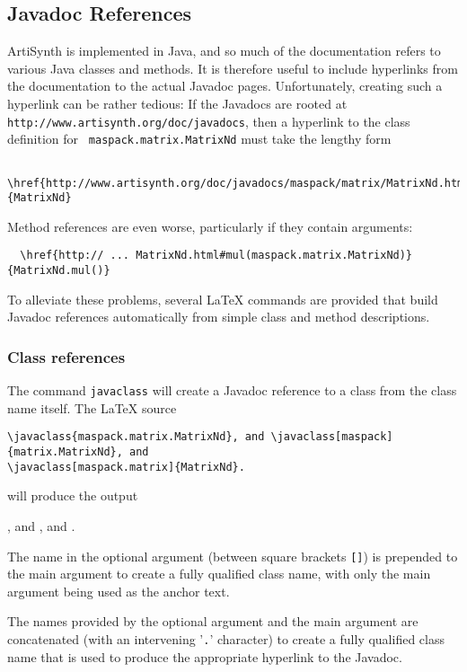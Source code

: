 \documentclass{article}
\begin{document}
\subsection{Javadoc References}
\label{JavadocRefsSec}

ArtiSynth is implemented in Java, and so much of the documentation
refers to various Java classes and methods. It is therefore useful to
include hyperlinks from the documentation to the actual Javadoc pages.
Unfortunately, creating such a hyperlink can be rather tedious: If the
Javadocs are rooted at {\tt http://www.artisynth.org/doc/javadocs},
then a hyperlink to the class definition for {\tt
maspack.matrix.MatrixNd} must take the lengthy form
\begin{verbatim}
  \href{http://www.artisynth.org/doc/javadocs/maspack/matrix/MatrixNd.html}{MatrixNd}
\end{verbatim}
Method references are even worse, particularly if they contain arguments:
\begin{verbatim}
  \href{http:// ... MatrixNd.html#mul(maspack.matrix.MatrixNd)}{MatrixNd.mul()}
\end{verbatim}
To alleviate these problems, several LaTeX commands are provided that
build Javadoc references automatically from simple class and
method descriptions.

\subsubsection{Class references}
\label{ClassRefsSec}

The command {\tt \BKS javaclass} will create a Javadoc reference to 
a class from the class name itself. The LaTeX source

\begin{lstlisting}[]
\javaclass{maspack.matrix.MatrixNd}, and \javaclass[maspack]{matrix.MatrixNd}, and
\javaclass[maspack.matrix]{MatrixNd}.
\end{lstlisting}

will produce the output

, and , and
.

The name in the optional argument (between square brackets {\tt []})
is prepended to the main argument to create a fully qualified class name,
with only the main argument being used as the anchor text. 

The names provided by the optional argument and the main argument are
concatenated (with an intervening '{\tt .}' character) to create a
fully qualified class name that is used to produce the appropriate
hyperlink to the Javadoc. 
\end{document}
